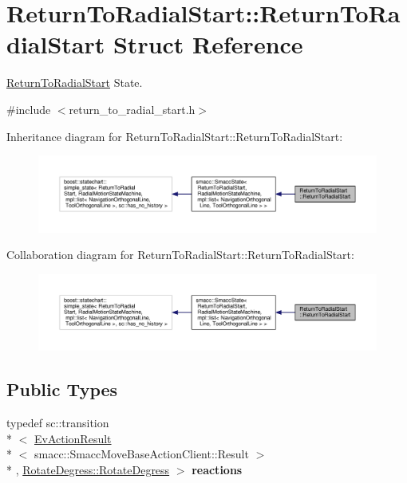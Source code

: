 \hypertarget{structReturnToRadialStart_1_1ReturnToRadialStart}{\section{Return\-To\-Radial\-Start\-:\-:Return\-To\-Radial\-Start Struct Reference}
\label{structReturnToRadialStart_1_1ReturnToRadialStart}
}


\hyperlink{structReturnToRadialStart_1_1ReturnToRadialStart}{Return\-To\-Radial\-Start} State.  




{\ttfamily \#include $<$return\-\_\-to\-\_\-radial\-\_\-start.\-h$>$}



Inheritance diagram for Return\-To\-Radial\-Start\-:\-:Return\-To\-Radial\-Start\-:
\nopagebreak
\begin{figure}[H]
\begin{center}
\leavevmode
\includegraphics[width=350pt]{structReturnToRadialStart_1_1ReturnToRadialStart__inherit__graph}
\end{center}
\end{figure}


Collaboration diagram for Return\-To\-Radial\-Start\-:\-:Return\-To\-Radial\-Start\-:
\nopagebreak
\begin{figure}[H]
\begin{center}
\leavevmode
\includegraphics[width=350pt]{structReturnToRadialStart_1_1ReturnToRadialStart__coll__graph}
\end{center}
\end{figure}
\subsection*{Public Types}
\begin{DoxyCompactItemize}
\item 
\hypertarget{structReturnToRadialStart_1_1ReturnToRadialStart_a74a509e54d1b8eefbaa1ff19ba6f5b57}{typedef sc\-::transition\\*
$<$ \hyperlink{structsmacc_1_1EvActionResult}{Ev\-Action\-Result}\\*
$<$ smacc\-::\-Smacc\-Move\-Base\-Action\-Client\-::\-Result $>$\\*
, \hyperlink{structRotateDegress_1_1RotateDegress}{Rotate\-Degress\-::\-Rotate\-Degress} $>$ {\bfseries reactions}}\label{structReturnToRadialStart_1_1ReturnToRadialStart_a74a509e54d1b8eefbaa1ff19ba6f5b57}

\end{DoxyCompactItemize}
